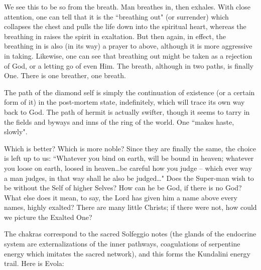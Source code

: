 We see this to be so from the breath. Man breathes in, then exhales. With close attention, one can tell that it is the ``breathing out" (or surrender) which collapses the chest and pulls the life down into the spiritual heart, whereas the breathing in raises the spirit in exaltation. But then again, in effect, the breathing in is also (in its way) a prayer to above, although it is more aggressive in taking. Likewise, one can see that breathing out might be taken as a rejection of God, or a letting go of even Him. The breath, although in two paths, is finally One. There is one breather, one breath.

The path of the diamond self is simply the continuation of existence (or a certain form of it) in the post-mortem state, indefinitely, which will trace its own way back to God. The path of hermit is actually swifter, though it seems to tarry in the fields and byways and inns of the ring of the world. One ``makes haste, slowly".

Which is better? Which is more noble? Since they are finally the same, the choice is left up to us: ``Whatever you bind on earth, will be bound in heaven; whatever you loose on earth, loosed in heaven…be careful how you judge – which ever way a man judges, in that way shall he also be judged…" Does the Super-man wish to be without the Self of higher Selves? How can he be God, if there is no God? What else does it mean, to say, the Lord has given him a name above every names, highly exalted? There are many little Christs; if there were not, how could we picture the Exalted One?

The chakras correspond to the sacred Solfeggio notes (the glands of the endocrine system are externalizations of the inner pathways, coagulations of serpentine energy which imitates the sacred network), and this forms the Kundalini energy trail. Here is Evola:

